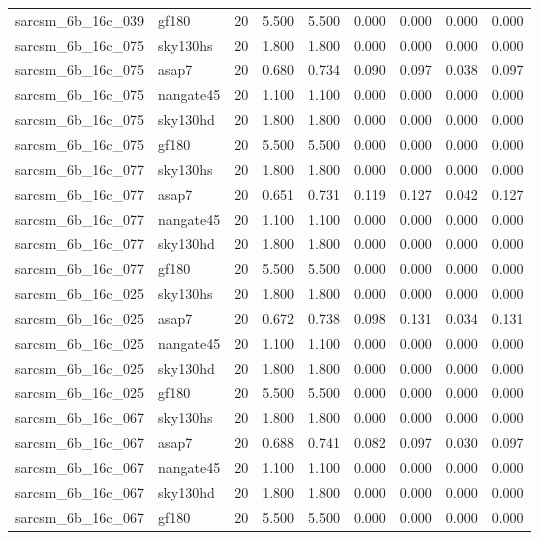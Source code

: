 \begin{tabular}{llrrrrrrr}
sarcsm\_6b\_16c\_039 & gf180 & 20 & 5.500 & 5.500 & 0.000 & 0.000 & 0.000 & 0.000 \\
sarcsm\_6b\_16c\_075 & sky130hs & 20 & 1.800 & 1.800 & 0.000 & 0.000 & 0.000 & 0.000 \\
sarcsm\_6b\_16c\_075 & asap7 & 20 & 0.680 & 0.734 & 0.090 & 0.097 & 0.038 & 0.097 \\
sarcsm\_6b\_16c\_075 & nangate45 & 20 & 1.100 & 1.100 & 0.000 & 0.000 & 0.000 & 0.000 \\
sarcsm\_6b\_16c\_075 & sky130hd & 20 & 1.800 & 1.800 & 0.000 & 0.000 & 0.000 & 0.000 \\
sarcsm\_6b\_16c\_075 & gf180 & 20 & 5.500 & 5.500 & 0.000 & 0.000 & 0.000 & 0.000 \\
sarcsm\_6b\_16c\_077 & sky130hs & 20 & 1.800 & 1.800 & 0.000 & 0.000 & 0.000 & 0.000 \\
sarcsm\_6b\_16c\_077 & asap7 & 20 & 0.651 & 0.731 & 0.119 & 0.127 & 0.042 & 0.127 \\
sarcsm\_6b\_16c\_077 & nangate45 & 20 & 1.100 & 1.100 & 0.000 & 0.000 & 0.000 & 0.000 \\
sarcsm\_6b\_16c\_077 & sky130hd & 20 & 1.800 & 1.800 & 0.000 & 0.000 & 0.000 & 0.000 \\
sarcsm\_6b\_16c\_077 & gf180 & 20 & 5.500 & 5.500 & 0.000 & 0.000 & 0.000 & 0.000 \\
sarcsm\_6b\_16c\_025 & sky130hs & 20 & 1.800 & 1.800 & 0.000 & 0.000 & 0.000 & 0.000 \\
sarcsm\_6b\_16c\_025 & asap7 & 20 & 0.672 & 0.738 & 0.098 & 0.131 & 0.034 & 0.131 \\
sarcsm\_6b\_16c\_025 & nangate45 & 20 & 1.100 & 1.100 & 0.000 & 0.000 & 0.000 & 0.000 \\
sarcsm\_6b\_16c\_025 & sky130hd & 20 & 1.800 & 1.800 & 0.000 & 0.000 & 0.000 & 0.000 \\
sarcsm\_6b\_16c\_025 & gf180 & 20 & 5.500 & 5.500 & 0.000 & 0.000 & 0.000 & 0.000 \\
sarcsm\_6b\_16c\_067 & sky130hs & 20 & 1.800 & 1.800 & 0.000 & 0.000 & 0.000 & 0.000 \\
sarcsm\_6b\_16c\_067 & asap7 & 20 & 0.688 & 0.741 & 0.082 & 0.097 & 0.030 & 0.097 \\
sarcsm\_6b\_16c\_067 & nangate45 & 20 & 1.100 & 1.100 & 0.000 & 0.000 & 0.000 & 0.000 \\
sarcsm\_6b\_16c\_067 & sky130hd & 20 & 1.800 & 1.800 & 0.000 & 0.000 & 0.000 & 0.000 \\
sarcsm\_6b\_16c\_067 & gf180 & 20 & 5.500 & 5.500 & 0.000 & 0.000 & 0.000 & 0.000 \\

\end{tabular}
